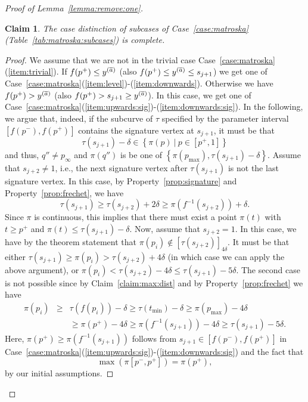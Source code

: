 \documentclass[11pt, letter]{article}
\newtheorem{claim}[theorem]{Claim}
\newcommand{\lemref}[1]{Lemma~\ref{lemma:#1}}
\newcommand{\tabref}[1]{Table~\ref{tab:#1}}
\newcommand{\caseref}[1]{Case~\ref{case:#1}}
\newcommand{\claimlab}[1]{\label{claim:#1}}
\newcommand{\claimref}[1]{Claim~\ref{claim:#1}}
\newcommand{\propref}[1]{Property~\ref{prop:#1}}
\providecommand{\brc}[1]{\left\{ {#1} \right\}}
\newcommand{\setSubC}[4]{\ensuremath{\brc{ #1(#2) ~|~ #2 \in [#3,#4]} }}
\newcommand{\range}[2]{\ensuremath{[#1]_{#2}}}
\newcommand{\maxSubC}[4]{\ensuremath{\max( #1[#3,#4])}}
\begin{document}
\begin{proof}[Proof of \lemref{remove:one}]
\begin{claim}
The case distinction of subcases of \caseref{matroska} (\tabref{matroska:subcases}) is complete. 
\claimlab{matroska:complete}
\end{claim}
\begin{proof}
We assume that we are not in the trivial case
\caseref{matroska}(\ref{item:trivial}). 
If $f(p^{+}) \leq y^{(\overline{a})}$ (also $f(p^{+}) \leq y^{(\overline{a})} \leq s_{j+1}$) 
we get one of
\caseref{matroska}(\ref{item:level})-(\ref{item:downwards}).
Otherwise we have $f(p^{+}) > y^{(\overline{a})}$ (also $f(p^{+}) > s_{j+1} \geq y^{(\overline{a})}$). In this case, we get one of  
\caseref{matroska}(\ref{item:upwards:sig})-(\ref{item:downwards:sig}).
In the following, we argue that, indeed, if the subcurve of $\tau$ specified by the parameter interval 
$[f(p^{-}),f(p^{+})]$ contains the signature vertex at $s_{j+1}$, it must be that 
\[ \tau(s_{j+1}) - \delta \in \setSubC{\pi}{p}{p^{+}}{1}\]
and thus, $q''\neq p_\infty$ and $\pi(q'')$ is be one of 
$\brc{\pi(p_{\max}), \tau(s_{j+1})-\delta}$.
Assume that $s_{j+2} \neq 1$, i.e., the next signature vertex after
$\tau(s_{j+1})$ is not the last signature vertex. In this case, by
\propref{signature} and \propref{frechet}, we have
\[\tau(s_{j+1}) \geq \tau(s_{j+2})+2\delta \geq \pi(f^{-1}(s_{j+2})) +
\delta.\]
Since $\pi$ is continuous, this implies that there must exist a point $\pi(t)$
with $t \geq p^{+}$ and $\pi(t) \leq \tau(s_{j+1})-\delta$.
Now, assume that $s_{j+2} = 1$. In this case, we have by the theorem statement
that $\pi(p_i) \notin \range{\tau(s_{j+2})}{4\delta}$.
It must be that either $\tau(s_{j+1}) \geq \pi(p_i) > \tau(s_{j+2}) + 4\delta $
(in which case we can apply the above argument), or 
$\pi(p_i) < \tau(s_{j+2}) - 4\delta \leq \tau(s_{j+1}) - 5\delta$. The second
case is not possible since by \claimref{max:dist} and by \propref{frechet}
we have 
\begin{eqnarray*}
\pi(p_i) &\geq& \tau(f(p_i)) -\delta \geq \tau(t_{\min}) -\delta \geq
\pi(p_{\max}) - 4\delta \\
&& \geq \pi(p^{+})-4\delta \geq \pi(f^{-1}(s_{j+1}))-4\delta
\geq \tau(s_{j+1}) - 5\delta.
\end{eqnarray*}
Here, $\pi(p^{+}) \geq \pi(f^{-1}(s_{j+1}))$ follows from $s_{j+1} \in [f(p^{-}), f(p^{+})]$ 
in \caseref{matroska}(\ref{item:upwards:sig})-(\ref{item:downwards:sig})
and the fact that 
\[ \maxSubC{\pi}{p}{p^{-}}{p^{+}} = \pi(p^{+}), \]
by our initial assumptions.
\end{proof}


\end{proof}
\end{document}
